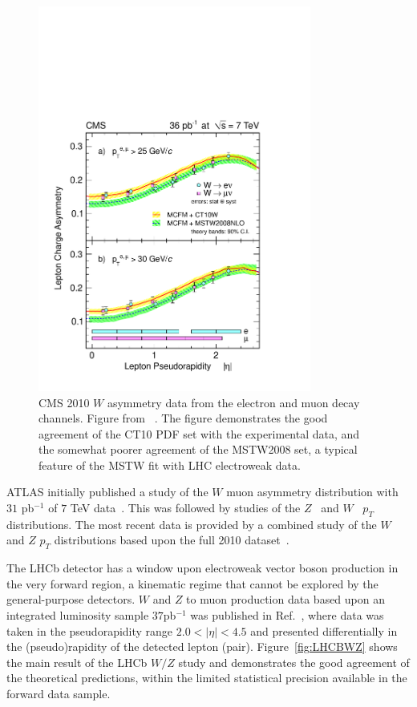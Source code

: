 \begin{figure}[ht]
\centering
\includegraphics[width=0.80\textwidth]{5-LHCdata/figs/fig2.pdf}
\caption[CMS 2010 $W$ asymmetry data]{CMS 2010 $W$ asymmetry data from the electron and muon decay channels. Figure from ~\cite{Chatrchyan:2011jz}. The figure demonstrates the good agreement of the CT10 PDF set with the experimental data, and the somewhat poorer agreement of the MSTW2008 set, a typical feature of the MSTW fit with LHC electroweak data.}
\label{fig:CMS2010WASY}
\end{figure}

ATLAS initially published a study of the $W$ muon asymmetry distribution with $31$ pb$^{-1}$ of $7$ TeV data~\cite{Aad:2011yna}. This was followed by studies of the $Z$~\cite{Aad:2011gj} and $W$~\cite{Aad:2011fp}  $p_T$ distributions. The most recent data is provided by a combined study of the $W$ and $Z$ $p_T$ distributions based upon the full 2010 dataset~\cite{Aad:2011dm}.

The LHCb detector has a window upon electroweak vector boson production in the very forward region, a kinematic regime that cannot be explored by the general-purpose detectors. $W$ and $Z$ to muon production data based upon an integrated luminosity sample $37$pb$^{-1}$ was published in Ref.~\cite{Aaij:2012vn}, where data was taken in the pseudorapidity range $2.0 < |\eta| < 4.5$ and presented differentially in the (pseudo)rapidity of the detected lepton (pair). Figure~\ref{fig:LHCBWZ} shows the main result of the LHCb $W/Z$ study and demonstrates the good agreement of the theoretical predictions, within the limited statistical precision available in the forward data sample.

